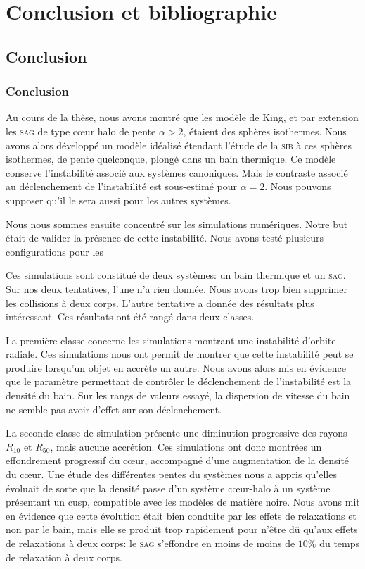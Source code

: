 \documentclass[a4paper,11pt,twoside,openright]{report}
\renewcommand{\(}{\ensuremath{\left(}}
\renewcommand{\)}{\ensuremath{\right)}}
\begin{document}
	\part*{Conclusion et bibliographie}
		\chapter{Conclusion}

		\section{Conclusion}

			Au cours de la thèse, nous avons montré que les modèle de King, et par extension les \textsc{sag} de type cœur halo de pente
			$\alpha>2$, étaient des sphères isothermes. Nous avons alors développé un modèle idéalisé étendant l'étude de la \textsc{sib}
			à ces sphères isothermes, de pente quelconque, plongé dans un bain thermique. Ce modèle conserve l'instabilité associé aux systèmes
			canoniques. Mais le contraste associé au déclenchement de l'instabilité est sous-estimé pour $\alpha=2$. Nous pouvons supposer
			qu'il le sera aussi pour les autres systèmes.

			Nous nous sommes ensuite concentré sur les simulations numériques. Notre but était de valider la présence de cette
			instabilité. Nous avons testé plusieurs configurations pour les

			Ces simulations sont constitué de deux systèmes: un bain thermique et un \textsc{sag}. Sur nos deux tentatives,
			l'une n'a rien donnée. Nous avons trop bien supprimer les collisions à deux corps. L'autre tentative a donnée des résultats
			plus intéressant. Ces résultats ont été rangé dans deux classes.

			La première classe concerne les simulations montrant une instabilité d'orbite radiale. Ces simulations nous ont permit
			de montrer que cette instabilité peut se produire lorsqu'un objet en accrète un autre. Nous avons alors mis en évidence que le
			paramètre permettant de contrôler le déclenchement de l'instabilité est la densité du bain. Sur les rangs de valeurs essayé,
			la dispersion de vitesse du bain ne semble pas avoir d'effet sur son déclenchement.

			La seconde classe de simulation présente une diminution progressive des rayons $R_{10}$ et $R_{50}$, mais aucune accrétion.
			Ces simulations ont donc montrées un effondrement progressif du cœur, accompagné d'une augmentation de la densité du cœur. Une
			étude des différentes pentes du systèmes nous a appris qu'elles évoluait de sorte que la densité passe d'un système cœur-halo
			à un système présentant un cusp, compatible avec les modèles de matière noire. Nous avons mit en évidence que cette évolution
			était bien conduite par les effets de relaxations et non par le bain, mais elle se produit trop rapidement pour n'être dû
			qu'aux effets de relaxations à deux corps: le \textsc{sag} s'effondre en moins de moins de $10\%$ du temps de relaxation à
			deux corps.
\end{document}
